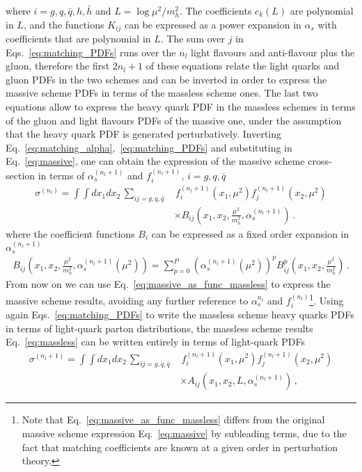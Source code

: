where $i = g, q, \bar{q}, h, \bar{h}$ and $L = \log \mu^2/m_h^2$. The coefficients $c_k\left(L\right)$ are polynomial in $L$,
and the functions $K_{ij}$ can be expressed as a power expansion in $\alpha_s$ with coefficients
that are polynomial in $L$. The sum over $j$ in Eqs.~\eqref{eq:matching_PDFs}
runs over the $n_l$ light flavours and anti-flavour plus the gluon, therefore the first $2n_l+1$
of these equations relate the light quarks and gluon PDFs in the two schemes and can be inverted in
order to express the massive scheme PDFs in terms of the massless scheme ones. The last two equations
allow to express the heavy quark PDF in the massless schemes in terms of the gluon and light flavours PDFs of the massive one,
under the assumption that the heavy quark PDF is generated perturbatively.
%
Inverting Eq.~\eqref{eq:matching_alpha},~\eqref{eq:matching_PDFs} and substituting in Eq.~\eqref{eq:massive},
one can obtain the expression of the massive scheme cross-section in terms of $\alpha_s^{(n_l+1)}$
and $f_i^{(n_l+1)}$, $i = g,q,\bar{q}$
\begin{align}
    \label{eq:massive_as_func_massless}
    \sigma^{(n_l)} = \int \int dx_1 dx_2\, \sum_{ij = g,q,\bar{q} }&\, 
    f_i^{(n_l+1)}\left(x_1,\mu^2\right)f_j^{(n_l+1)}\left(x_2,\mu^2\right) \nonumber \\
    &\times B_{ij}\left(x_1,x_2,\frac{\mu^2}{m_h^2},\alpha_s^{(n_l+1)}\right)\,.
\end{align}
where the coefficient functions $B_i$ can be expressed as a fixed order expansion in $\alpha_s^{(n_l+1)}$
\begin{align}
    \label{eq:massive_1}
    B_{ij}\left(x_1,x_2,\frac{\mu^2}{m_h^2},\alpha_s^{(n_l+1)}\left(\mu^2\right)\right)
    = \sum_{p=0}^P \left(\alpha_s^{(n_l+1)}\left(\mu^2\right)\right)^p B_{ij}^p\left(x_1,x_2,\frac{\mu^2}{m_h^2}\right)\,.
\end{align}
From now on we can use Eq.~\eqref{eq:massive_as_func_massless} to express the massive scheme results, avoiding
any further reference to $\alpha_s^{n_l}$ and $f_i^{(n_l)}$\footnote{Note that Eq.~\eqref{eq:massive_as_func_massless}
differs from the original massive scheme expression Eq.~\eqref{eq:massive} by subleading terms,
due to the fact that matching coefficients are known at a given order in perturbation theory.}.
Using again Eqs.~\eqref{eq:matching_PDFs} to write the massless scheme heavy quarks PDFs in terms of light-quark parton
distributions, the massless scheme results Eq.~\eqref{eq:massless} can be written entirely in terms of 
light-quark PDFs
\begin{align}
    \label{eq:massless_1}
    \sigma^{(n_l+1)} = \int \int dx_1 dx_2\, \sum_{ij=g,q,\bar{q}}&\, 
    f_i^{(n_l+1)}\left(x_1,\mu^2\right)f_j^{(n_l+1)}\left(x_2,\mu^2\right) \nonumber \\
    &\times A_{ij}\left(x_1,x_2,L,\alpha_s^{(n_l+1)}\right)\,,
\end{align}
